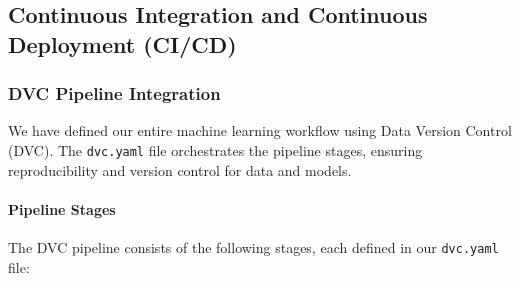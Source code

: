 \documentclass{article}
\begin{document}
\subsection{Continuous Integration and Continuous Deployment (CI/CD)}

\subsubsection{DVC Pipeline Integration}

We have defined our entire machine learning workflow using Data Version Control (DVC). The \texttt{dvc.yaml} file orchestrates the pipeline stages, ensuring reproducibility and version control for data and models.

\paragraph{Pipeline Stages}

The DVC pipeline consists of the following stages, each defined in our \texttt{dvc.yaml} file:
\end{document}
